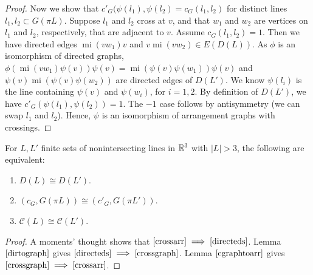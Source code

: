 \documentclass[11pt, oneside]{article}
\newcommand{\mi}{\operatorname{mi}}
\begin{document}
\begin{proof}
Now we show that $c'_G(\psi(l_1), \psi(l_2) = c_G(l_1, l_2)$ for distinct lines $l_1, l_2 \subset G(\pi L)$. Suppose $l_1$ and $l_2$ cross at $v$, and that $w_1$ and $w_2$ are vertices on $l_1$ and $l_2$, respectively, that are adjacent to $v$. Assume $c_G(l_1, l_2) =1$. Then we have directed edges $\mi(vw_1)v$ and $ v \mi(vw_2) \in E(D(L))$. As $\phi$ is an isomorphism of directed graphs, $\phi(\mi(vw_1)\psi(v))\psi(v) = \mi (\psi(v)\psi(w_1))\psi(v)$ and $\psi(v)\mi (\psi(v)\psi(w_2))$ are directed edges of $D(L')$. We know $\psi(l_i)$ is the line containing $\psi(v)$ and $\psi(w_i)$, for $i=1,2$. By definition of $D(L')$, we have $c'_G(\psi(l_1), \psi(l_2)) = 1$. The $-1$ case follows by antisymmetry (we can swap $l_1$ and $l_2$). Hence, $\psi$ is an isomorphism of arrangement graphs with crossings. 
\end{proof}

\begin{thm} For $L, L'$ finite sets of nonintersecting lines in $\mathbb{R}^3$ with $|L| > 3$, the following are equivalent:
\begin{enumerate}
\item $D(L) \cong D(L')$. \label{directeds}
\item $(c_G, G(\pi L))\cong (c'_G, G(\pi L'))$. \label{crossgraph}
\item $\mathcal{C}(L) \cong \mathcal{C}(L')$. \label{crossarr}
\end{enumerate}
\end{thm}

\begin{proof}
A moments' thought shows that $\ref{crossarr} \implies \ref{directeds}$.  Lemma $\ref{dirtograph}$ gives $\ref{directeds} \implies \ref{crossgraph}$. Lemma $\ref{cgraphtoarr}$ gives $\ref{crossgraph} \implies \ref{crossarr}$. \end{proof}
 
 







 
\end{document}
